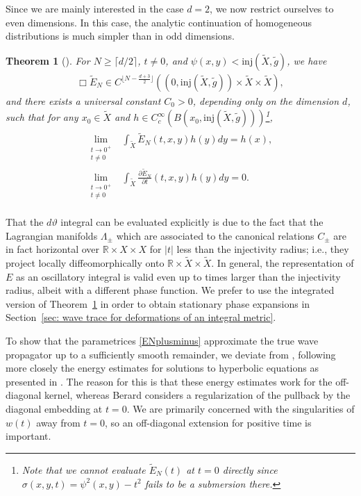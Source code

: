 \documentclass[11pt,letterpaper,oneside]{amsart}
\newcommand{\R}{\mathbb{R}}
\newcommand{\inj}{\text{inj}}
\renewcommand{\theta}{\vartheta}
\newtheorem{theo}{Theorem}[section]
\theoremstyle{definition}
\theoremstyle{remark}
\newcommand{\wt}{\widetilde}
\theoremstyle{definition}
\theoremstyle{remark}
\begin{document}
\medskip

Since we are mainly interested in the case $d = 2$, we now restrict ourselves to even dimensions. In this case, the analytic continuation of homogeneous distributions is much simpler than in odd dimensions.



\begin{theo}[\cite{Berard77}] \label{Berard}
    For $N \geq \lceil d/2 \rceil$, $t \neq 0$, and $\psi(x,y) < \inj(\wt X, \wt g)$, we have
    \begin{align*}
        \Box \wt E_N \in C^{\lfloor N - \frac{d+3}{2}\rfloor}((0, \inj(\wt X,\wt g)) \times \wt X \times \wt X),
    \end{align*}
    and there exists a universal constant $C_0 > 0$, depending only on the dimension $d$, such that for any $x_0 \in \wt X$ and $h \in C_c^\infty(B(x_0,\inj(\wt X, \wt g)))$\footnote{Note that we cannot evaluate $\wt E_N(t)$ at $t= 0$ directly since $\sigma(x,y,t) = \psi^2(x,y) - t^2$ fails to be a submersion there.},
    \begin{align}
        \begin{split}
            \lim_{\substack{t \to 0^+ \\ t \neq 0}} &\int_{\wt X} \wt E_N(t,x,y) h(y) dy = h(x),\\
            \lim_{\substack{t \to 0^+ \\ t \neq 0}} &\int_{\wt X} \frac{\partial \wt E_N}{\partial t}(t,x,y) h(y)dy = 0.
        \end{split}
    \end{align}
\end{theo}

That the $d \theta$ integral can be evaluated explicitly is due to the fact that the Lagrangian manifolds $\Lambda_\pm$ which are associated to the canonical relations $C_\pm$ are in fact horizontal over $\R \times X \times X$ for $|t|$ less than the injectivity radius; i.e., they project locally diffeomorphically onto $\R \times \wt X \times \wt X$. In general, the representation of $E$ as an oscillatory integral is valid even up to times larger than the injectivity radius, albeit with a different phase function. We prefer to use the integrated version of Theorem~\ref{Berard} in order to obtain stationary phase expansions in Section~\ref{sec: wave trace for deformations of an integral metric}.

\medskip

To show that the parametrices \eqref{ENplusminus} approximate the true wave propagator up to a sufficiently smooth remainder, we deviate from \cite{Berard77}, following more closely the energy estimates for solutions to hyperbolic equations as presented in \cite{Ho90}. The reason for this is that these energy estimates work for the off-diagonal kernel, whereas Berard considers a regularization of the pullback by the diagonal embedding at $t = 0$. We are primarily concerned with the singularities of $w(t)$ away from $t=0$, so an off-diagonal extension for positive time is important.
\end{document}
